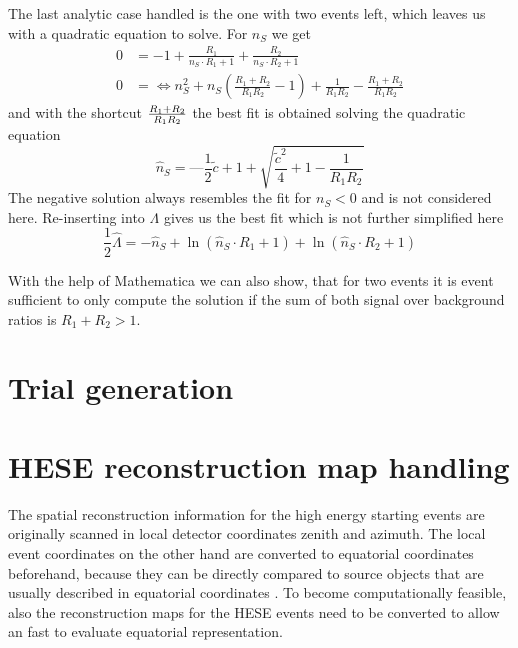The last analytic case handled is the one with two events left, which leaves us with a quadratic equation to solve.
For $n_S$ we get
\begin{align}
  0 &= -1 + \frac{R_1}{n_S\cdot R_1 + 1} + \frac{R_2}{n_S\cdot R_2 + 1} \\
  0 &= \Leftrightarrow n_S^2 + n_S \left(\frac{R_1 + R_2}{R_1 R_2} - 1\right) +
       \frac{1}{R_1 R_2} - \frac{R_1 + R_2}{R_1 R_2}
\end{align}
and with the shortcut $\frac{R_1 + R_2}{R_1 R_2} \def \tilde{c}$ the best fit is obtained solving the quadratic equation
\begin{equation}
  \hat{n}_S = —\frac{1}{2}\tilde{c} + 1 + \sqrt{\frac{\tilde{c}^2}{4} + 1 - \frac{1}{R_1 R_2}}
\end{equation}
The negative solution always resembles the fit for $n_S < 0$ and is not considered here.
Re-inserting into $\Lambda$ gives us the best fit which is not further simplified here
\begin{equation}
  \frac{1}{2}\hat{\Lambda} = -\hat{n}_S +
                             \ln\left( \hat{n}_S \cdot R_1 + 1 \right) +
                             \ln\left( \hat{n}_S \cdot R_2 + 1 \right)
\end{equation}

With the help of Mathematica we can also show, that for two events it is event sufficient to only compute the solution if the sum of both signal over background ratios is $R_1 + R_2 > 1$.


\section{Trial generation}


\section{HESE reconstruction map handling}
The spatial reconstruction information for the high energy starting events are originally scanned in local detector coordinates zenith and azimuth.
The local event coordinates on the other hand are converted to equatorial coordinates beforehand, because they can be directly compared to source objects that are  usually described in equatorial coordinates .
To become computationally feasible, also the reconstruction maps for the HESE events need to be converted to allow an fast to evaluate equatorial representation.

